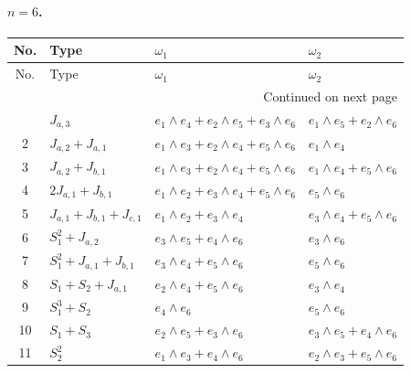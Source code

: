 \paragraph{$n=6$.}
\begin{longtable}{@{}c p{} p{} p{}@{}}
\toprule
No. & Type & $\omega_1$ & $\omega_2$ \\
\midrule
\endfirsthead
\toprule
No. & Type & $\omega_1$ & $\omega_2$ \\
\midrule
\endhead
\midrule
\multicolumn{4}{r}{Continued on next page}\\
\midrule
\endfoot
\bottomrule
\endlastfoot
1 & \(J_{a,3}\) & $e_{1} \wedge e_{4} + e_{2} \wedge e_{5} + e_{3} \wedge e_{6}$ & $e_{1} \wedge e_{5} + e_{2} \wedge e_{6}$ \\
2 & \(J_{a,2} + J_{a,1}\) & $e_{1} \wedge e_{3} + e_{2} \wedge e_{4} + e_{5} \wedge e_{6}$ & $e_{1} \wedge e_{4}$ \\
3 & \(J_{a,2} + J_{b,1}\) & $e_{1} \wedge e_{3} + e_{2} \wedge e_{4} + e_{5} \wedge e_{6}$ & $e_{1} \wedge e_{4} + e_{5} \wedge e_{6}$ \\
4 & \(2J_{a,1} + J_{b,1}\) & $e_{1} \wedge e_{2} + e_{3} \wedge e_{4} + e_{5} \wedge e_{6}$ & $e_{5} \wedge e_{6}$ \\
5 & \(J_{a,1} + J_{b,1} + J_{c,1}\) & $e_{1} \wedge e_{2} + e_{3} \wedge e_{4}$ & $e_{3} \wedge e_{4} + e_{5} \wedge e_{6}$ \\
6 & \(S_1^2 + J_{a,2}\) & $e_{3} \wedge e_{5} + e_{4} \wedge e_{6}$ & $e_{3} \wedge e_{6}$ \\
7 & \(S_1^2 + J_{a,1} + J_{b,1}\) & $e_{3} \wedge e_{4} + e_{5} \wedge e_{6}$ & $e_{5} \wedge e_{6}$ \\
8 & \(S_1 + S_2 + J_{a,1}\) & $e_{2} \wedge e_{4} + e_{5} \wedge e_{6}$ & $e_{3} \wedge e_{4}$ \\
9 & \(S_1^3 + S_2\) & $e_{4} \wedge e_{6}$ & $e_{5} \wedge e_{6}$ \\
10 & \(S_1 + S_3\) & $e_{2} \wedge e_{5} + e_{3} \wedge e_{6}$ & $e_{3} \wedge e_{5} + e_{4} \wedge e_{6}$ \\
11 & \(S_2^2\) & $e_{1} \wedge e_{3} + e_{4} \wedge e_{6}$ & $e_{2} \wedge e_{3} + e_{5} \wedge e_{6}$ \\
\end{longtable}


